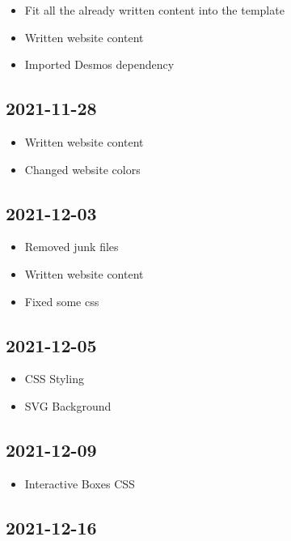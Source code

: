 \documentclass{article}
\begin{document}
\begin{itemize}
    \item Fit all the already written content into the template
    \item Written website content
    \item Imported Desmos dependency
\end{itemize}

\subsection*{2021-11-28}

\begin{itemize}
    \item Written website content
    \item Changed website colors
\end{itemize}

\subsection*{2021-12-03}

\begin{itemize}
    \item Removed junk files
    \item Written website content
    \item Fixed some css
\end{itemize}

\subsection*{2021-12-05}

\begin{itemize}
    \item CSS Styling
    \item SVG Background
\end{itemize}

\subsection*{2021-12-09}

\begin{itemize}
    \item Interactive Boxes CSS
\end{itemize}

\subsection*{2021-12-16}
\end{document}

